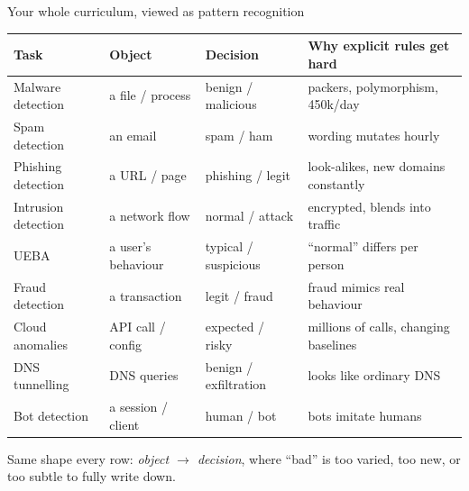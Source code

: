 \documentclass[aspectratio=169,10pt]{beamer}
\begin{document}
\begin{frame}{Your whole curriculum, viewed as pattern recognition}
  \scriptsize
  \renewcommand{\arraystretch}{1.25}
  \begin{tabular}{>{\raggedright\arraybackslash}p{2.5cm} >{\raggedright\arraybackslash}p{3.2cm} >{\raggedright\arraybackslash}p{3.0cm} >{\raggedright\arraybackslash}p{4.0cm}}
    \toprule
    \textbf{Task} & \textbf{Object} & \textbf{Decision} & \textbf{Why explicit rules get hard}\\
    \midrule
    Malware detection   & a file / process    & benign / malicious      & packers, polymorphism, 450k/day\\
    Spam detection      & an email            & spam / ham              & wording mutates hourly\\
    Phishing detection  & a URL / page        & phishing / legit        & look-alikes, new domains constantly\\
    Intrusion detection & a network flow      & normal / attack         & encrypted, blends into traffic\\
    UEBA                & a user's behaviour  & typical / suspicious    & ``normal'' differs per person\\
    Fraud detection     & a transaction       & legit / fraud           & fraud mimics real behaviour\\
    Cloud anomalies     & API call / config   & expected / risky        & millions of calls, changing baselines\\
    DNS tunnelling      & DNS queries         & benign / exfiltration   & looks like ordinary DNS\\
    Bot detection       & a session / client  & human / bot             & bots imitate humans\\
    \bottomrule
  \end{tabular}
  \vfill
  {\footnotesize\color{midgray}Same shape every row: \emph{object $\to$ decision},
  where ``bad'' is too varied, too new, or too subtle to fully write down.}
\end{frame}
\end{document}
